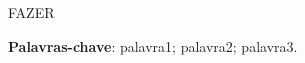 \documentclass[
    12pt,				%
    oneside,   	        %
    a4paper,			%
    english,			%
    french,				%
    spanish,			%
    brazil,				%
    ]{pacotes/abntex2}
\begin{document}
\frenchspacing 



\imprimirfolhaderosto



\begin{resumo}
FAZER

 \vspace{\onelineskip}
    
 \noindent
 \textbf{Palavras-chave}: palavra1; palavra2; palavra3.
\end{resumo}



\end{document}

